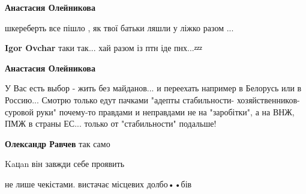 \begin{itemize}
\begin{itemize}
\textbf{Анастасия Олейникова} 

шкереберть все пішло , як твої батьки ляшли у ліжко разом ...

 
\textbf{Igor Ovchar} таки так... хай разом із птн іде пнх...💤

 
\textbf{Анастасия Олейникова} 

У Вас есть выбор - жить без майданов... и переехать например в Белорусь или в
Россию... Смотрю только едут пачками "адепты стабильности-
хозяйственников-суровой руки" почему-то правдами и неправдами не на
"заробітки", а на ВНЖ, ПМЖ в страны ЕС... только от "стабильности" подальше!


 
\textbf{Олександр Равчев} так само

\end{itemize}

 
Kaцan він завжди себе проявить

 
не лише чекістами. вистачає місцевих долбо••бів

 

\end{itemize}

